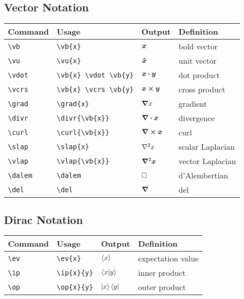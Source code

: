 \documentclass[11pt]{article}
\begin{document}
\subsection{Vector Notation}

\begin{tabular}{llll}
    Command       & Usage                      & Output                 & Definition       \\
    \hline
    \verb|\vb|    & \verb|\vb{x}|              & $\bm{x}$               & bold vector      \\
    \verb|\vu|    & \verb|\vu{x}|              & $\bm{\hat{x}}$               & unit vector      \\
    \verb|\vdot|  & \verb|\vb{x} \vdot \vb{y}| & $\bm{x} \bm{\cdot} \bm{y}$  & dot product      \\
    \verb|\vcrs|  & \verb|\vb{x} \vcrs \vb{y}| & $\bm{x} \bm{\times} \bm{y}$  & cross product    \\
    \verb|\grad|  & \verb|\grad{x}|            & $\bm{\nabla} x$             & gradient         \\
    \verb|\divr|  & \verb|\divr{\vb{x}}|       & $\bm{\nabla} \bm{\cdot} \bm{x}$        & divergence       \\
    \verb|\curl|  & \verb|\curl{\vb{x}}|       & $\bm{\nabla} \bm{\times} \bm{x}$        & curl             \\
    \verb|\slap|  & \verb|\slap{x}|            & $\nabla^2 x$             & scalar Laplacian \\
    \verb|\vlap|  & \verb|\vlap{\vb{x}}|       & $\bm{\nabla}^2 \bm{x}$        & vector Laplacian \\
    \verb|\dalem| & \verb|\dalem|              & $\dalem$               & d'Alembertian    \\
    \verb|\del|   & \verb|\del|                & $\bm{\nabla}$                 & del              \\
\end{tabular}

\subsection{Dirac Notation}

\begin{tabular}{llll}
    Command    & Usage            & Output      & Definition        \\
    \hline
    \verb|\ev| & \verb|\ev{x}|    & $\braket{x}$    & expectation value \\
    \verb|\ip| & \verb|\ip{x}{y}| & $\braket{x|y}$ & inner product     \\
    \verb|\op| & \verb|\op{x}{y}| & $\ket{x}\bra{y}$ & outer product     \\
\end{tabular}
\end{document}
